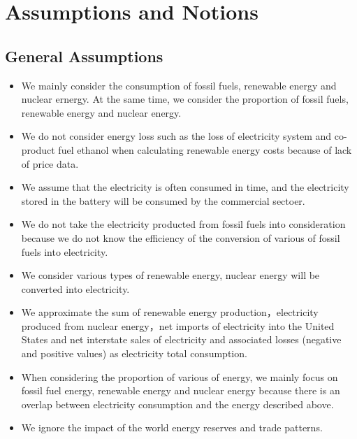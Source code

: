 \section{Assumptions and Notions}
\subsection{General Assumptions}
\begin{itemize}
	\item We mainly consider the consumption of fossil fuels, renewable energy and nuclear ernergy. At the same time, we consider the proportion of fossil fuels, renewable energy and nuclear energy.
	\item We do not consider energy loss such as the loss of  electricity system and co-product fuel ethanol when calculating renewable energy costs because of lack of price data.
	\item We assume that the electricity is often consumed in time, and the electricity stored in the battery will be consumed by the commercial sectoer.
	\item We do not take the electricity producted from fossil fuels into consideration because we do not know the efficiency of the conversion of various of fossil fuels into electricity.
	\item We consider various types of renewable energy,  nuclear energy will be converted into electricity.
	\item We approximate the sum of renewable energy production，electricity produced from nuclear energy，net imports of electricity into the United States and net interstate sales of electricity and associated losses (negative and positive values) as electricity total consumption.
	\item When considering the proportion of various of energy, we mainly focus on fossil fuel energy, renewable energy and nuclear energy because there is an overlap between electricity consumption and the energy described above.
	\item We ignore the impact of the world energy reserves and trade patterns.
\end{itemize}
